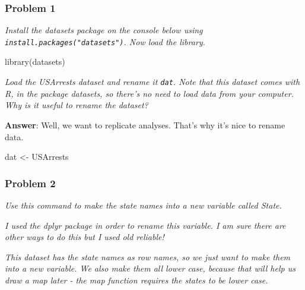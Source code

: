 \documentclass[
]{article}
\newenvironment{Shaded}{\begin{snugshade}}{\end{snugshade}}
\newcommand{\FunctionTok}[1]{\textcolor[rgb]{0.00,0.00,0.00}{#1}}
\newcommand{\NormalTok}[1]{#1}
\newcommand{\OtherTok}[1]{\textcolor[rgb]{0.56,0.35,0.01}{#1}}
\newcommand{\SpecialCharTok}[1]{\textcolor[rgb]{0.00,0.00,0.00}{#1}}
\begin{document}
\hypertarget{problem-1}{%
\subsubsection{Problem 1}\label{problem-1}}

\emph{Install the datasets package on the console below using
\texttt{install.packages("datasets")}. Now load the library.}

\begin{Shaded}
\begin{Highlighting}[]
\FunctionTok{library}\NormalTok{(datasets)}
\end{Highlighting}
\end{Shaded}

\emph{Load the USArrests dataset and rename it \texttt{dat}. Note that
this dataset comes with R, in the package datasets, so there's no need
to load data from your computer. Why is it useful to rename the
dataset?}

\textbf{Answer}: Well, we want to replicate analyses. That's why it's
nice to rename data.

\begin{Shaded}
\begin{Highlighting}[]
\NormalTok{dat }\OtherTok{\textless{}{-}}\NormalTok{ USArrests}
\end{Highlighting}
\end{Shaded}

\hypertarget{problem-2}{%
\subsubsection{Problem 2}\label{problem-2}}

\emph{Use this command to make the state names into a new variable
called State. }

\begin{Shaded}
\end{Shaded}

\emph{I used the dplyr package in order to rename this variable. I am
sure there are other ways to do this but I used old reliable!}

\emph{This dataset has the state names as row names, so we just want to
make them into a new variable. We also make them all lower case, because
that will help us draw a map later - the map function requires the
states to be lower case.}
\end{document}
